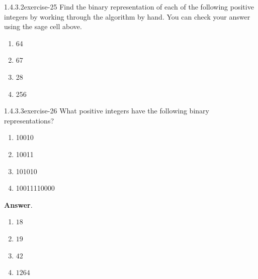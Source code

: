 \documentclass[twoside,10pt,]{book}
\numberwithin{equation}{section}
\begin{document}
\begin{divisionsolution}{1.4.3.2}{}{exercise-25}%
\hypertarget{p-439}{}%
Find the binary representation of each of the following positive integers by working through the algorithm by hand.  You can check your answer using the sage cell above.%
\par
\hypertarget{p-440}{}%
\leavevmode%
\begin{multicols}{2}
\begin{enumerate}[label=(\alph*)]
\item\hypertarget{li-322}{}\hypertarget{p-441}{}%
64%
\item\hypertarget{li-323}{}\hypertarget{p-442}{}%
67%
\item\hypertarget{li-324}{}\hypertarget{p-443}{}%
28%
\item\hypertarget{li-325}{}\hypertarget{p-444}{}%
256%
\end{enumerate}
\end{multicols}
%
\end{divisionsolution}%
\begin{divisionsolution}{1.4.3.3}{}{exercise-26}%
\hypertarget{p-445}{}%
What positive integers have the following binary representations?%
\par
\hypertarget{p-446}{}%
\leavevmode%
\begin{multicols}{2}
\begin{enumerate}[label=(\alph*)]
\item\hypertarget{li-326}{}\hypertarget{p-447}{}%
10010%
\item\hypertarget{li-327}{}\hypertarget{p-448}{}%
10011%
\item\hypertarget{li-328}{}\hypertarget{p-449}{}%
101010%
\item\hypertarget{li-329}{}\hypertarget{p-450}{}%
10011110000%
\end{enumerate}
\end{multicols}
%
\par\smallskip%
\noindent\textbf{Answer}.\quad%
\hypertarget{p-451}{}%
\leavevmode%
\begin{multicols}{2}
\begin{enumerate}[label=(\alph*)]
\item\hypertarget{li-330}{}\hypertarget{p-452}{}%
\(18\)%
\item\hypertarget{li-331}{}\hypertarget{p-453}{}%
\(19\)%
\item\hypertarget{li-332}{}\hypertarget{p-454}{}%
\(42\)%
\item\hypertarget{li-333}{}\hypertarget{p-455}{}%
\(1264\)%
\end{enumerate}
\end{multicols}
%
\end{divisionsolution}%
\end{document}

